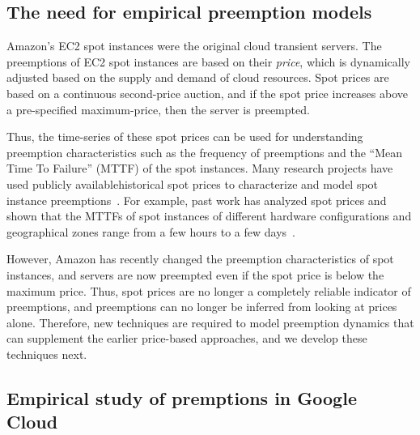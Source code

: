 \subsection{The need for empirical preemption models}
\label{subsec:need-for-empirical}

Amazon's EC2 spot instances were the original cloud transient servers.
The preemptions of EC2 spot instances are based on their \emph{price}, which is dynamically adjusted based on the supply and demand of cloud resources.
Spot prices are based on a continuous second-price auction, and if the spot price increases above a pre-specified maximum-price, then the server is preempted.

Thus, the time-series of these spot prices can be used for understanding preemption characteristics such as the frequency of preemptions and the ``Mean Time To Failure'' (MTTF) of the spot instances.
Many research projects have used publicly available\footnotemark historical spot prices to characterize and model spot instance preemptions~\cite{spotcheck,how-to-bid}. %
For example, past work has analyzed spot prices and shown that the MTTFs of spot instances of different hardware configurations and geographical zones range from a few hours to a few days~\cite{prateek-thesis, shastri-thesis}. 



However, Amazon has recently changed the preemption characteristics of spot instances, and servers are now preempted even if the spot price is below the maximum price.
Thus, spot prices are no longer a completely reliable indicator of preemptions, and preemptions can no longer be inferred from looking at prices alone.
Therefore, new techniques are required to model preemption dynamics that can supplement the earlier price-based approaches, and we develop these techniques next.


\subsection{Empirical study of premptions in Google Cloud}

